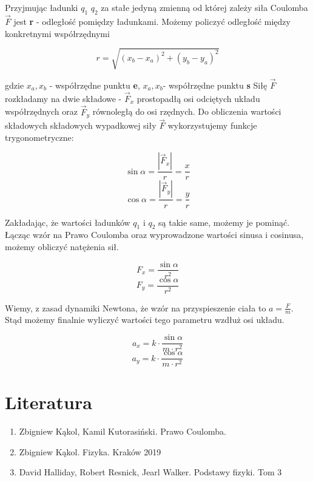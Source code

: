 \documentclass{article}
\begin{document}
Przyjmując ładunki $q_1$  $q_2$ za stałe jedyną zmienną od której zależy siła Coulomba $\vec{F}$ jest \textbf{r} - odległość pomiędzy ładunkami. Możemy policzyć odległość między konkretnymi współrzędnymi

$$
    r = \sqrt{(x_b - x_a)^2 + (y_b - y_a)^2}
$$

gdzie $ x_a, x_b$ - współrzędne punktu \textbf{e}, $x_a, x_b$- współrzędne punktu \textbf{s}
Siłę $\vec{F}$ rozkładamy na dwie składowe - $\vec{F}_x$ prostopadłą osi odciętych układu współrzędnych oraz $\vec{F}_y$ równoległą do osi rzędnych. Do obliczenia wartości składowych składowych wypadkowej siły $\vec{F}$ wykorzystujemy funkcje trygonometryczne:

\begin{multicols}{2}
  \begin{equation}
    \sin{\alpha} = \frac{|\vec{F}_x|}{r} = \frac{x}{r}
  \end{equation}\break
  \begin{equation}
    \cos{\alpha} = \frac{|\vec{F}_y|}{r} = \frac{y}{r}
  \end{equation}
\end{multicols}

Zakładając, że wartości ładunków $q_1$ i $q_2$ są takie same, możemy je pominąć. Łącząc wzór na Prawo Coulomba oraz wyprowadzone wartości sinusa i cosinusa, możemy obliczyć natężenia sił.

\begin{multicols}{2}
  \begin{equation}
    F_x = \frac{\sin{\alpha}}{r^2}
  \end{equation}\break
  \begin{equation}
    F_y = \frac{\cos{\alpha}}{r^2}
  \end{equation}
\end{multicols}


Wiemy, z zasad dynamiki Newtona, że wzór na przyspieszenie ciała to $a = \frac{F}{m}$. Stąd możemy finalnie wyliczyć wartości tego parametru wzdłuż osi układu. 

\begin{multicols}{2}
  \begin{equation}
    a_x = k \cdot \frac{\sin{\alpha}}{m \cdot r^2}
  \end{equation}\break
  \begin{equation}
    a_y = k \cdot \frac{\cos{\alpha}}{m \cdot r^2}
  \end{equation}
\end{multicols}

\fi


\section{Literatura}
\begin{enumerate}
    \item Zbigniew Kąkol, Kamil Kutorasiński. Prawo Coulomba. 
    \item Zbigniew Kąkol. Fizyka. Kraków 2019
    \item David Halliday, Robert Resnick, Jearl Walker. Podstawy fizyki. Tom 3
\end{enumerate}
\end{document}
